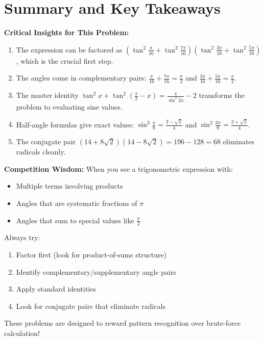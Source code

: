 \documentclass[12pt]{article}
\begin{document}
\section{Summary and Key Takeaways}

\begin{keyinsight}
\textbf{Critical Insights for This Problem:}

\begin{enumerate}
    \item The expression can be factored as $\left(\tan^2\frac{\pi}{16}+\tan^2 \frac{7\pi}{16}\right)\left(\tan^2\frac{3\pi}{16}+\tan^2 \frac{5\pi}{16}\right)$, which is the crucial first step.
    
    \item The angles come in complementary pairs: $\frac{\pi}{16} + \frac{7\pi}{16} = \frac{\pi}{2}$ and $\frac{3\pi}{16} + \frac{5\pi}{16} = \frac{\pi}{2}$.
    
    \item The master identity $\tan^2 x + \tan^2(\frac{\pi}{2}-x) = \frac{4}{\sin^2 2x} - 2$ transforms the problem to evaluating sine values.
    
    \item Half-angle formulas give exact values: $\sin^2\frac{\pi}{8} = \frac{2-\sqrt{2}}{4}$ and $\sin^2\frac{3\pi}{8} = \frac{2+\sqrt{2}}{4}$.
    
    \item The conjugate pair $(14+8\sqrt{2})(14-8\sqrt{2}) = 196-128 = 68$ eliminates radicals cleanly.
\end{enumerate}
\end{keyinsight}

\begin{protip}
\textbf{Competition Wisdom:} When you see a trigonometric expression with:
\begin{itemize}
    \item Multiple terms involving products
    \item Angles that are systematic fractions of $\pi$
    \item Angles that sum to special values like $\frac{\pi}{2}$
\end{itemize}

Always try:
\begin{enumerate}
    \item Factor first (look for product-of-sums structure)
    \item Identify complementary/supplementary angle pairs
    \item Apply standard identities
    \item Look for conjugate pairs that eliminate radicals
\end{enumerate}

These problems are designed to reward pattern recognition over brute-force calculation!
\end{protip}
\end{document}
